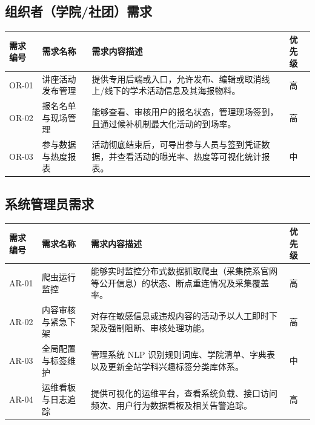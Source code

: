\documentclass[UTF8,a4paper,12pt,fontset=none]{ctexrep}
\begin{document}
\subsection{组织者（学院/社团）需求}

\begingroup
\small
\begin{longtable}{|>{\raggedright\arraybackslash}p{}|>{\raggedright\arraybackslash}p{}|>{\raggedright\arraybackslash}p{}|>{\raggedright\arraybackslash}p{}|}
\hline
\textbf{需求编号} & \textbf{需求名称} & \textbf{需求内容描述} & \textbf{优先级} \\
\hline
OR-01 & 讲座活动发布管理 & 提供专用后端或入口，允许发布、编辑或取消线上/线下的学术活动信息及其海报物料。 & 高 \\
\hline
OR-02 & 报名名单与现场管理 & 能够查看、审核用户的报名状态，管理现场签到，且通过候补机制最大化活动的到场率。 & 高 \\
\hline
OR-03 & 参与数据与热度报表 & 活动彻底结束后，可导出参与人员与签到凭证数据，并查看活动的曝光率、热度等可视化统计报表。 & 中 \\
\hline
\end{longtable}
\endgroup

\subsection{系统管理员需求}

\begingroup
\small
\begin{longtable}{|>{\raggedright\arraybackslash}p{}|>{\raggedright\arraybackslash}p{}|>{\raggedright\arraybackslash}p{}|>{\raggedright\arraybackslash}p{}|}
\hline
\textbf{需求编号} & \textbf{需求名称} & \textbf{需求内容描述} & \textbf{优先级} \\
\hline
AR-01 & 爬虫运行监控 & 能够实时监控分布式数据抓取爬虫（采集院系官网等公开信息）的状态、断点重连情况及采集覆盖率。 & 高 \\
\hline
AR-02 & 内容审核与紧急下架 & 对存在敏感信息或违规内容的活动予以人工即时下架及强制阻断、审核处理功能。 & 高 \\
\hline
AR-03 & 全局配置与标签维护 & 管理系统 NLP 识别规则词库、学院清单、字典表以及更新全站学科兴趣标签分类库体系。 & 中 \\
\hline
AR-04 & 运维看板与日志追踪 & 提供可视化的运维平台，查看系统负载、接口访问频次、用户行为数据看板及相关告警追踪。 & 高 \\
\hline
\end{longtable}
\endgroup
\end{document}
